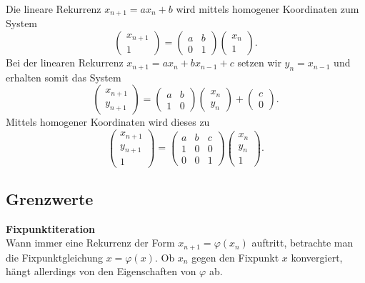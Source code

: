\documentclass[paper=180mm:225mm,pagesize=auto,fleqn,twoside,11pt,dvipdfmx]{scrartcl}
\theoremstyle{rmbox}
\newenvironment{Rezept}[1]{\strong{#1}\\}{}
\newcommand{\strong}[1]{\textsf{\textbf{#1}}}
\begin{document}
\noindent
Die lineare Rekurrenz $x_{n+1}=ax_n+b$ wird 
mittels homogener Koordinaten zum System%
\[\begin{pmatrix}
x_{n+1}\\ 1
\end{pmatrix}
= \begin{pmatrix}a & b\\ 0 & 1\end{pmatrix}
\begin{pmatrix}
x_n\\ 1
\end{pmatrix}.\]
Bei der linearen Rekurrenz $x_{n+1}=ax_n+bx_{n-1}+c$ setzen wir
$y_n = x_{n-1}$ und erhalten somit das System
\[\begin{pmatrix}
x_{n+1}\\ y_{n+1}
\end{pmatrix} = \begin{pmatrix}
a & b\\ 1 & 0
\end{pmatrix}\begin{pmatrix}
x_n\\ y_n
\end{pmatrix}+\begin{pmatrix}
c\\ 0
\end{pmatrix}.\]
Mittels homogener Koordinaten wird dieses zu
\[\begin{pmatrix}
x_{n+1}\\ y_{n+1}\\ 1
\end{pmatrix} = \begin{pmatrix}
a & b & c\\
1 & 0 & 0\\
0 & 0 & 1
\end{pmatrix}\begin{pmatrix}
x_n\\ y_n\\ 1
\end{pmatrix}.\]

\newpage
\subsection{Grenzwerte}

\begin{Rezept}{Fixpunktiteration}
Wann immer eine Rekurrenz der Form $x_{n+1} = \varphi(x_n)$
auftritt, betrachte man die Fixpunktgleichung $x = \varphi(x)$. Ob
$x_n$ gegen den Fixpunkt $x$ konvergiert, hängt allerdings von den
Eigenschaften von $\varphi$ ab.
\end{Rezept}
\end{document}
